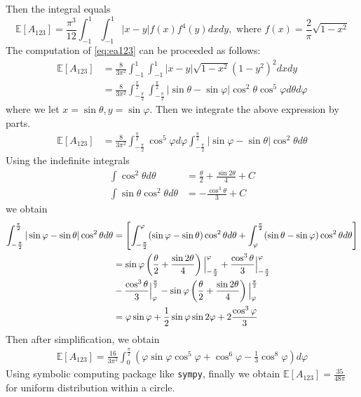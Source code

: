 \documentclass{article}
\def\E{\mathbb{E}}
\begin{document}
Then the integral equals
\begin{equation}\label{eq:ea123}
    \E[A_{123}] =
    \frac{\pi^3}{12}
    \int_{-1}^{1}\int_{-1}^{1}
    |x-y|f(x)f^4(y)dxdy, \textrm{ where }
    f(x) = \frac{2}{\pi}\sqrt{1-x^2}
\end{equation}
The computation of \eqref{eq:ea123}
can be proceeded as follows:
\begin{align*}
    \E[A_{123}] & =
    \frac{8}{3\pi^2}
    \int_{-1}^{1}\int_{-1}^{1}
    |x-y|\sqrt{1-x^2}
    (1-y^2)^2
    dxdy \\
    & = \frac{8}{3\pi^2}
    \int_{-\frac{\pi}{2}}^{\frac{\pi}{2}}
    \int_{-\frac{\pi}{2}}^{\frac{\pi}{2}}
    |\sin\theta - \sin\varphi|
    \cos^2\theta \cos^5\varphi
    d\theta d\varphi
\end{align*}
where we let $x=\sin \theta, y = \sin \varphi$.
Then we integrate the above expression by parts.
\begin{align*}
    \E[A_{123}] & = \frac{8}{3\pi^2}
    \int_{-\frac{\pi}{2}}^{\frac{\pi}{2}}
    \cos^5\varphi d\varphi
    \int_{-\frac{\pi}{2}}^{\frac{\pi}{2}}
    |\sin\varphi - \sin\theta|
    \cos^2\theta
    d\theta
\end{align*}
Using the indefinite integrals
\begin{align*}
\int \cos^2 \theta d\theta & = \frac{\theta}{2}
+ \frac{\sin 2 \theta}{4} + C\\
\int \sin \theta \cos^2 \theta d\theta & =
- \frac{\cos^3 \theta}{3} + C
\end{align*}
we obtain
\begin{align} \label{eq:abs_integral_computation}
    \int_{-\frac{\pi}{2}}^{\frac{\pi}{2}}
    |\sin\varphi - \sin\theta|
    \cos^2\theta
    d\theta
    &=\left[
    \int_{-\frac{\pi}{2}}^{\varphi}
    (\sin\varphi - \sin\theta)
    \cos^2\theta
    d\theta
    + \int_{\varphi}^{\frac{\pi}{2}}
    (\sin\theta - \sin\varphi)
    \cos^2\theta
    d\theta
    \right]\\
    &=
    \sin\varphi\left(
        \frac{\theta}{2}
    + \frac{\sin 2 \theta}{4}
    \right)
    \Big\vert_{-\frac{\pi}{2}}^{\varphi}
    + \frac{\cos^3\theta}{3}\Big\vert_{-\frac{\pi}{2}}^{\varphi}\notag\\
    &-\frac{\cos^3\theta}{3}\Big\vert_{\varphi}^{\frac{\pi}{2}}
    -\sin\varphi
    \left(
        \frac{\theta}{2}
    + \frac{\sin 2 \theta}{4}
    \right)\Big\vert_{\varphi}^{\frac{\pi}{2}}\notag\\
    &=
    \varphi\sin\varphi
    + \frac{1}{2}\sin\varphi
    \sin 2\varphi
    + 2\frac{\cos^3 \varphi}{3}\notag
\end{align}
Then after simplification, we obtain
\begin{align*}
    \E[A_{123}] =
    \frac{16}{3\pi^2}
    \int_0^{\frac{\pi}{2}}
    (\varphi \sin\varphi \cos^5 \varphi
    + \cos^6 \varphi - \frac{1}{3}
    \cos^8 \varphi
    )d\varphi
\end{align*}
Using symbolic computing package like \texttt{sympy},
finally we obtain $\E[A_{123}]=\frac{35}{48 \pi}$
for uniform distribution within a circle.
\end{document}
